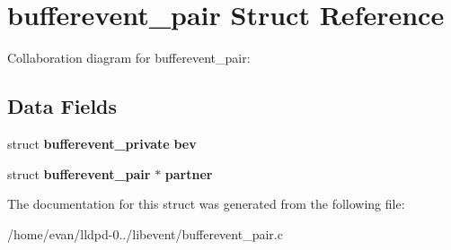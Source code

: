 \section{bufferevent\-\_\-pair \-Struct \-Reference}
\label{structbufferevent__pair}


\-Collaboration diagram for bufferevent\-\_\-pair\-:
\subsection*{\-Data \-Fields}
\begin{DoxyCompactItemize}
\item 
struct {\bf bufferevent\-\_\-private} {\bfseries bev}\label{structbufferevent__pair_ac89d86467e491d6accc55fc1aaea8a13}

\item 
struct {\bf bufferevent\-\_\-pair} $\ast$ {\bfseries partner}\label{structbufferevent__pair_ab8b86b0b5f7abd26d1a06c3afdc37fb7}

\end{DoxyCompactItemize}


\-The documentation for this struct was generated from the following file\-:\begin{DoxyCompactItemize}
\item 
/home/evan/lldpd-\/0../libevent/bufferevent\-\_\-pair.\-c\end{DoxyCompactItemize}
